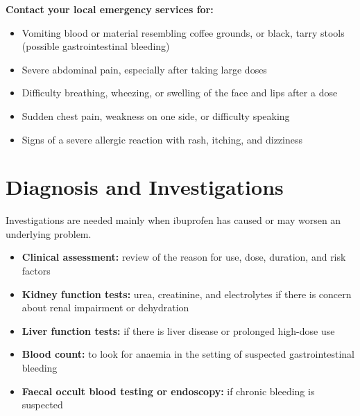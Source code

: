 \textbf{Contact your local emergency services for:}
\begin{itemize}
    \item Vomiting blood or material resembling coffee grounds, or black, tarry stools (possible gastrointestinal bleeding)
    \item Severe abdominal pain, especially after taking large doses
    \item Difficulty breathing, wheezing, or swelling of the face and lips after a dose
    \item Sudden chest pain, weakness on one side, or difficulty speaking
    \item Signs of a severe allergic reaction with rash, itching, and dizziness
\end{itemize}

\section*{Diagnosis and Investigations}
Investigations are needed mainly when ibuprofen has caused or may worsen an underlying problem.
\begin{itemize}
    \item \textbf{Clinical assessment:} review of the reason for use, dose, duration, and risk factors
    \item \textbf{Kidney function tests:} urea, creatinine, and electrolytes if there is concern about renal impairment or dehydration
    \item \textbf{Liver function tests:} if there is liver disease or prolonged high-dose use
    \item \textbf{Blood count:} to look for anaemia in the setting of suspected gastrointestinal bleeding
    \item \textbf{Faecal occult blood testing or endoscopy:} if chronic bleeding is suspected
\end{itemize}

